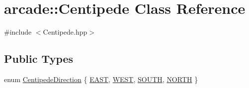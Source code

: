 \hypertarget{classarcade_1_1_centipede}{\section{arcade\-:\-:Centipede Class Reference}
\label{classarcade_1_1_centipede}
}


{\ttfamily \#include $<$Centipede.\-hpp$>$}

\subsection*{Public Types}
\begin{DoxyCompactItemize}
\item 
enum \hyperlink{classarcade_1_1_centipede_a5ee9df78614426762a3960348e1bc27b}{Centipede\-Direction} \{ \hyperlink{classarcade_1_1_centipede_a5ee9df78614426762a3960348e1bc27ba7d421fd2ab675f151e98fdeb0ec2db93}{E\-A\-S\-T}, 
\hyperlink{classarcade_1_1_centipede_a5ee9df78614426762a3960348e1bc27ba177a3ef7ab855bde37c9abe7bbdbdfad}{W\-E\-S\-T}, 
\hyperlink{classarcade_1_1_centipede_a5ee9df78614426762a3960348e1bc27ba23f74b2268eacbde2d764036693e081a}{S\-O\-U\-T\-H}, 
\hyperlink{classarcade_1_1_centipede_a5ee9df78614426762a3960348e1bc27bad77fa33a31c6231a772e749d6a10bc6e}{N\-O\-R\-T\-H}
 \}
\end{DoxyCompactItemize}
